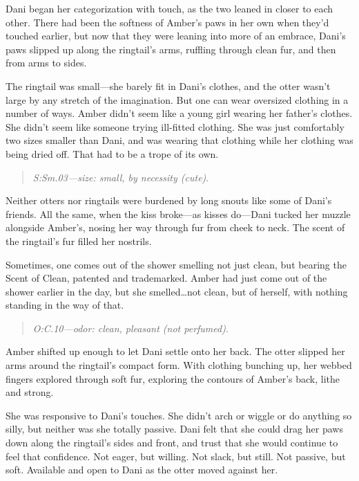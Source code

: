 Dani began her categorization with touch, as the two leaned in closer to each other. There had been the softness of Amber's paws in her own when they'd touched earlier, but now that they were leaning into more of an embrace, Dani's paws slipped up along the ringtail's arms, ruffling through clean fur, and then from arms to sides.

The ringtail was small---she barely fit in Dani's clothes, and the otter wasn't large by any stretch of the imagination. But one can wear oversized clothing in a number of ways. Amber didn't seem like a young girl wearing her father's clothes. She didn't seem like someone trying ill-fitted clothing. She was just comfortably two sizes smaller than Dani, and was wearing that clothing while her clothing was being dried off. That had to be a trope of its own.

\vspace{-0.2cm}
\begin{quote}
\emph{S:Sm.03---size: small, by necessity (cute)}.
\end{quote}
\vspace{-0.2cm}

Neither otters nor ringtails were burdened by long snouts like some of Dani's friends. All the same, when the kiss broke---as kisses do---Dani tucked her muzzle alongside Amber's, nosing her way through fur from cheek to neck. The scent of the ringtail's fur filled her nostrils.

Sometimes, one comes out of the shower smelling not just clean, but bearing the Scent of Clean, patented and trademarked. Amber had just come out of the shower earlier in the day, but she smelled\ldots{}not clean, but of herself, with nothing standing in the way of that.

\vspace{-0.2cm}
\begin{quote}
\emph{O:C.10---odor: clean, pleasant (not perfumed)}.
\end{quote}
\vspace{-0.2cm}

Amber shifted up enough to let Dani settle onto her back. The otter slipped her arms around the ringtail's compact form. With clothing bunching up, her webbed fingers explored through soft fur, exploring the contours of Amber's back, lithe and strong.

She was responsive to Dani's touches. She didn't arch or wiggle or do anything so silly, but neither was she totally passive. Dani felt that she could drag her paws down along the ringtail's sides and front, and trust that she would continue to feel that confidence. Not eager, but willing. Not slack, but still. Not passive, but soft. Available and open to Dani as the otter moved against her.

